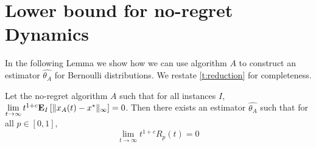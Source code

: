 \section{Lower bound for no-regret Dynamics}\label{app:s:lower_bound}

In the following Lemma we show how we can use algorithm $A$ to construct an
estimator $\hat{\theta_A}$ for Bernoulli distributions.
We restate \ref{t:reduction} for completeness.
\begin{theorem}

  Let the no-regret algorithm $A$ such that
  for all instances $I$, $\lim \limits_{t \rightarrow \infty} t^{1+c}
  \bm{\mathrm{E}}_{I} \left[ \| x_A(t)-x^* \|_{\infty} \right]=0$.  Then there exists an estimator
  $\hat{\theta_A}$ such that for all
  $p \in [0,1]$, \[\lim_{t \rightarrow \infty}t^{1+c}R_p(t)=0\]

\end{theorem}


